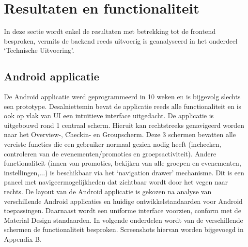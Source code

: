 
\chapter{Resultaten en functionaliteit}
In deze sectie wordt enkel de resultaten met betrekking tot de frontend besproken, vermits de backend reeds uitvoerig is geanalyseerd in het onderdeel `Technische Uitvoering'.
\section{Android applicatie}
De Android applicatie werd geprogrammeerd in 10 weken en is bijgevolg slechts een prototype. Desalniettemin bevat de applicatie reeds alle functionaliteit en is ook op vlak van UI een intuïtieve interface uitgedacht.
De applicatie is uitgebouwd rond 1 centraal scherm. Hieruit kan rechtstreeks genavigeerd worden naar het Overview-, Checkin- en Groupscherm. Deze 3 schermen bevatten alle vereiste functies die een gebruiker normaal gezien nodig heeft (inchecken, controleren van de evenementen/promoties en groepsactiviteit). Andere functionaliteit (innen van promoties, bekijken van alle groepen en evenementen, instellingen,...) is beschikbaar via het `navigation drawer' mechanisme. Dit is een paneel met navigeermogelijkheden dat zichtbaar wordt door het vegen naar rechts. De layout van de Android applicatie is gekozen na analyse van verschillende Android applicaties en huidige ontwikkelstandaarden voor Android toepassingen. Daarnaast wordt een uniforme interface voorzien, conform met de Material Design standaarden. In volgende onderdelen wordt van de verschillende schermen de functionaliteit besproken. Screenshots hiervan worden bijgevoegd in Appendix B.
